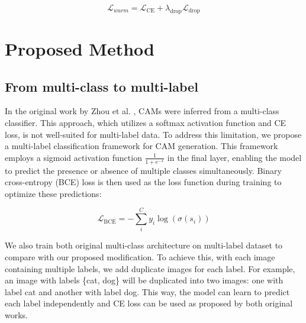 \documentclass[conference]{IEEEtran}
\begin{document}
\begin{equation}
    \mathcal{L}_{warm} = \mathcal{L}_{\text{CE}} + \lambda_{\text{drop}}\mathcal{L}_{\text{drop}}
\end{equation}






\section{Proposed Method}
\subsection{From multi-class to multi-label}
In the original work by Zhou et al. \cite{zhou2015cnnlocalization}, CAMs were inferred from a multi-class classifier. This approach, which utilizes a softmax activation function and CE loss, is not well-suited for multi-label data. To address this limitation, we propose a multi-label classification framework for CAM generation. This framework employs a sigmoid activation function $\frac{1}{1 + e^{-x}}$ in the final layer, enabling the model to predict the presence or absence of multiple classes simultaneously. Binary cross-entropy (BCE) loss is then used as the loss function during training to optimize these predictions:

\begin{equation}
    \mathcal{L}_{\text{BCE}} = -\sum_{i}^{C}{y_i \log(\sigma(s_i))}
\end{equation}

We also train both original multi-class architecture \cite{zhou2015cnnlocalization} \cite{kim2022bridging} on multi-label dataset to compare with our proposed modification. To achieve this, with each image containing multiple labels, we add duplicate images for each label. For example, an image with labels \{cat, dog\} will be duplicated into two images: one with label cat and another with label dog. This way, the model can learn to predict each label independently and CE loss can be used as proposed by both original works.
\end{document}
